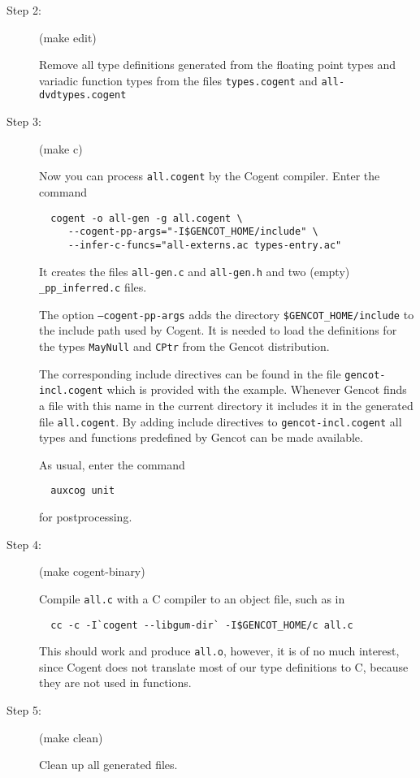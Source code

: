 \documentclass[a4paper]{report}
\newcommand{\code}[1]{\textnormal{\texttt{#1}}}
\begin{document}
\begin{description}
\item[Step 2:] (make edit)

Remove all type definitions generated from the floating point types and variadic function types 
from the files \code{types.cogent} and \code{all-dvdtypes.cogent}

\item[Step 3:] (make c)

Now you can process \code{all.cogent} by the Cogent compiler. Enter the command
\begin{verbatim}
  cogent -o all-gen -g all.cogent \
     --cogent-pp-args="-I$GENCOT_HOME/include" \
     --infer-c-funcs="all-externs.ac types-entry.ac"
\end{verbatim}
It creates the files \code{all-gen.c} and \code{all-gen.h} and two (empty) \code{\_pp\_inferred.c} files. 

The option \code{--cogent-pp-args} adds the directory \code{\$GENCOT\_HOME/include} to the include path
used by Cogent. It is needed to load the definitions for the types \code{MayNull} and \code{CPtr} from
the Gencot distribution. 

The corresponding include directives can be found in the file \code{gencot-incl.cogent}
which is provided with the example. Whenever Gencot finds a file with this name in the current directory it 
includes it in the generated file \code{all.cogent}. By adding include directives to \code{gencot-incl.cogent}
all types and functions predefined by Gencot can be made available.

As usual, enter the command
\begin{verbatim}
  auxcog unit
\end{verbatim}
for postprocessing.

\item[Step 4:] (make cogent-binary)

Compile \code{all.c} with a C compiler to an object file, such as in 
\begin{verbatim}
  cc -c -I`cogent --libgum-dir` -I$GENCOT_HOME/c all.c
\end{verbatim}
This should work and produce \code{all.o}, however, it is of no much interest,
since Cogent does not translate most of our type definitions to C, because they are not used in functions.

\item[Step 5:] (make clean)

Clean up all generated files.
\end{description}
\end{document}
